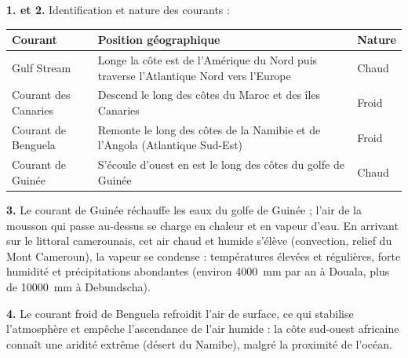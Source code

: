 \documentclass[11pt]{article}
\begin{document}
\begin{corrige}
\textbf{1. et 2.} Identification et nature des courants :
\begin{center}
\begin{tabularx}{\linewidth}{|l|X|X|}
\hline
\rowcolor{popblueL} \textbf{Courant} & \textbf{Position géographique} & \textbf{Nature} \\
\hline
Gulf Stream & Longe la côte est de l'Amérique du Nord puis traverse l'Atlantique Nord vers l'Europe & Chaud \\
\hline
Courant des Canaries & Descend le long des côtes du Maroc et des îles Canaries & Froid \\
\hline
Courant de Benguela & Remonte le long des côtes de la Namibie et de l'Angola (Atlantique Sud-Est) & Froid \\
\hline
Courant de Guinée & S'écoule d'ouest en est le long des côtes du golfe de Guinée & Chaud \\
\hline
\end{tabularx}
\end{center}

\textbf{3.} Le courant de Guinée réchauffe les eaux du golfe de Guinée ; l'air de la mousson qui passe au-dessus se charge en chaleur et en vapeur d'eau. En arrivant sur le littoral camerounais, cet air chaud et humide s'élève (convection, relief du Mont Cameroun), la vapeur se condense : températures élevées et régulières, forte humidité et précipitations abondantes (environ \SI{4000}{mm} par an à Douala, plus de \SI{10000}{mm} à Debundscha).

\textbf{4.} Le courant froid de Benguela refroidit l'air de surface, ce qui stabilise l'atmosphère et empêche l'ascendance de l'air humide : la côte sud-ouest africaine connaît une aridité extrême (désert du Namibe), malgré la proximité de l'océan.
\end{corrige}
\end{document}
